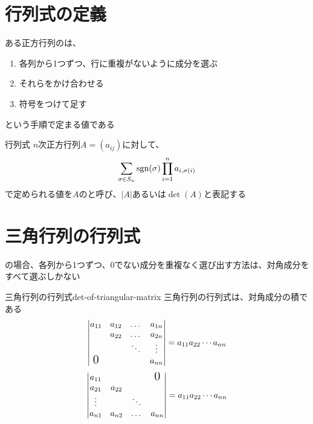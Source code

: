 \documentclass[../../../topic_linear-algebra]{subfiles}
\begin{document}
\sectionline
\section{行列式の定義}

ある正方行列のは、
\begin{enumerate}
  \item 各列から1つずつ、行に重複がないように成分を選ぶ
  \item それらをかけ合わせる
  \item 符号をつけて足す
\end{enumerate}
という手順で定まる値である

\begin{definition*}{行列式}
  $n$次正方行列$A = (a_{ij})$に対して、
  \begin{equation*}
    \sum_{\sigma \in S_n} \operatorname{sgn}(\sigma) \prod_{i=1}^n a_{i,\sigma(i)}
  \end{equation*}
  で定められる値を$A$のと呼び、$|A|$あるいは$\det(A)$と表記する
\end{definition*}

\sectionline
\section{三角行列の行列式}

の場合、各列から1つずつ、0でない成分を重複なく選び出す方法は、対角成分をすべて選ぶしかない

\begin{theorem}{三角行列の行列式}{det-of-triangular-matrix}
  三角行列の行列式は、対角成分の積である
  \begin{equation*}
    \left|\begin{matrix}
      a_{11}           & a_{12} & \dots  & a_{1n} \\
                       & a_{22} & \dots  & a_{2n} \\
                       &        & \ddots & \vdots \\
      \text{\Large{0}} &        &        & a_{nn}
    \end{matrix}\right| = a_{11} a_{22} \cdots a_{nn}
  \end{equation*}
  \begin{equation*}
    \left|\begin{matrix}
      a_{11} &        &        & \text{\Large{0}} \\
      a_{21} & a_{22}                             \\
      \vdots &        & \ddots                    \\
      a_{n1} & a_{n2} & \dots  & a_{nn}
    \end{matrix}\right| = a_{11} a_{22} \cdots a_{nn}
  \end{equation*}
\end{theorem}
\end{document}
